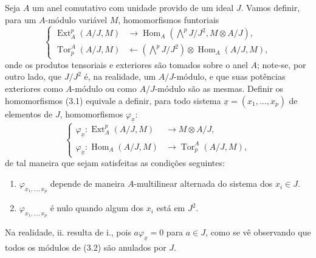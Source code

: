 \documentclass[11pt,twoside,openany]{book}
\numberwithin{equation}{section}
\newcommand{\src}[1]{%
  \phantomsection\hypertarget{src:#1}{}%
  \marginpar{\raggedleft\footnotesize\sffamily #1}%
}
\theoremstyle{plain}
\theoremstyle{definition}
\theoremstyle{remark}
\newcommand{\FgaUnitKey}{frontmatter}
\renewcommand{\src}[1]{%
  \phantomsection\hypertarget{src:\FgaUnitKey:#1}{}%
  \marginpar{\raggedleft\footnotesize\sffamily #1}%
}
\begin{document}
Seja $A$ um anel comutativo com unidade provido de um ideal $J$. Vamos
definir, para um $A$-módulo variável $M$, homomorfismos funtoriais
\begin{equation}\tag{3.1}
\left\{
\begin{aligned}
\operatorname{Ext}_{A}^{p}(A/J,M)
  &\longrightarrow
  \operatorname{Hom}_{A}\!\left(\bigwedge^{p}J/J^{2},M\otimes A/J\right),\\
\operatorname{Tor}_{p}^{A}(A/J,M)
  &\longleftarrow
  \left(\bigwedge^{p}J/J^{2}\right)
  \otimes\operatorname{Hom}_{A}(A/J,M),
\end{aligned}
\right.
\end{equation}
onde os produtos tensoriais e exteriores são tomados sobre o anel $A$; note-se,
por outro lado, que $J/J^{2}$ é, na realidade, um $A/J$-módulo, e que suas potências
exteriores como $A$-módulo ou como $A/J$-módulo são as mesmas.
Definir os homomorfismos (3.1) equivale a definir, para todo
sistema $\underline{x}=(x_1,\ldots,x_p)$ de elementos de $J$, homomorfismos
$\varphi_{\underline{x}}$:
\begin{equation}\tag{3.2}
\left\{
\begin{aligned}
\varphi_{\underline{x}}:
  \operatorname{Ext}_{A}^{p}(A/J,M)&\longrightarrow M\otimes A/J,\\
\varphi_{\underline{x}}:
  \operatorname{Hom}_{A}(A/J,M)&\longrightarrow
  \operatorname{Tor}_{p}^{A}(A/J,M),
\end{aligned}
\right.
\end{equation}
de tal maneira que sejam satisfeitas as condições seguintes:

\src{174}
\begin{enumerate}
\item[\textup{i.}] $\varphi_{x_1,\ldots,x_p}$ depende de maneira
$A$-multilinear alternada do sistema dos $x_i\in J$.
\item[\textup{ii.}] $\varphi_{x_1,\ldots,x_p}$ é nulo quando algum dos $x_i$ está
em $J^{2}$.
\end{enumerate}
Na realidade, ii. resulta de i., pois $a\varphi_{\underline{x}}=0$ para $a\in J$,
como se vê observando que todos os módulos de (3.2) são anulados por
$J$.
\end{document}

